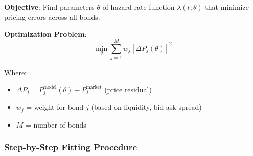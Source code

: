 \documentclass[11pt,a4paper]{article}
\begin{document}
\begin{keybox}
\textbf{Objective}: Find parameters $\theta$ of hazard rate function $\lambda(t; \theta)$ that minimize pricing errors across all bonds.

\textbf{Optimization Problem}:
\begin{equation}
\min_{\theta} \sum_{j=1}^{M} w_j \left[\Delta P_j(\theta)\right]^2
\end{equation}

Where:
\begin{itemize}
    \item $\Delta P_j = P_j^{\text{model}}(\theta) - P_j^{\text{market}}$ (price residual)
    \item $w_j$ = weight for bond $j$ (based on liquidity, bid-ask spread)
    \item $M$ = number of bonds
\end{itemize}
\end{keybox}

\subsubsection{Step-by-Step Fitting Procedure}
\end{document}
